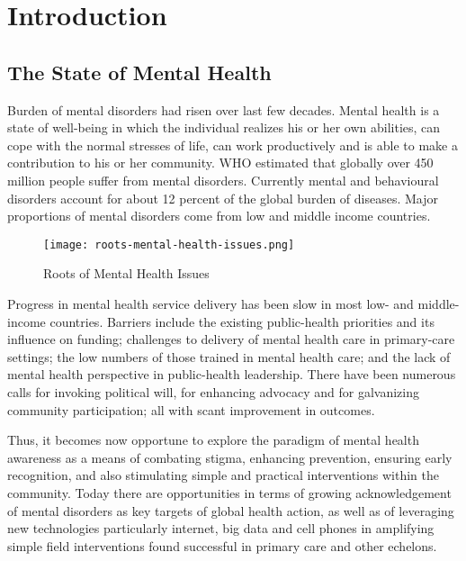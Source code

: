 \chapter{Introduction}

\pagebreak

\section{The State of Mental Health}

Burden of mental disorders had risen over last few decades. Mental health is a state of well-being in which the individual realizes his or her own abilities, can cope with the normal stresses of life, can work productively and is able to make a contribution to his or her community. WHO estimated that globally over 450 million people suffer from mental disorders. Currently mental and behavioural disorders account for about 12 percent of the global burden of diseases. Major proportions of mental disorders come from low and middle income countries.

\begin{figure}[H]
    \centering
    \texttt{[image: roots-mental-health-issues.png]}
    \caption{Roots of Mental Health Issues}
    \label{fig:roots-mental-health-issues}
\end{figure}

Progress in mental health service delivery has been slow in most low- and middle-income countries. Barriers include the existing public-health priorities and its influence on funding; challenges to delivery of mental health care in primary-care settings; the low numbers of those trained in mental health care; and the lack of mental health perspective in public-health leadership. There have been numerous calls for invoking political will, for enhancing advocacy and for galvanizing community participation; all with scant improvement in outcomes.

Thus, it becomes now opportune to explore the paradigm of mental health awareness as a means of combating stigma, enhancing prevention, ensuring early recognition, and also stimulating simple and practical interventions within the community. Today there are opportunities in terms of growing acknowledgement of mental disorders as key targets of global health action, as well as of leveraging new technologies particularly internet, big data and cell phones in amplifying simple field interventions found successful in primary care and other echelons.

